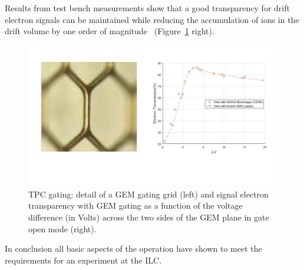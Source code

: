 Results from test bench measurements show that a good transparency for drift electron signals can be maintained while reducing the accumulation of ions in the drift volume by one order of magnitude~\cite{ild:bib:TPC_gatingpaper} (Figure~\ref{fig:det:TPC_gating} right).

\begin{figure}[t!]
\centering
\includegraphics[width=1.0\hsize]{Detector/fig/TPC_gating.jpg}
\caption{TPC gating: detail of a GEM gating grid (left) and signal electron transparency with GEM gating as a function of the voltage difference (in Volts) across the two sides of the GEM plane in gate open mode (right).} 
\label{fig:det:TPC_gating}
\end{figure}

In conclusion all basic aspects of the operation have shown to meet the requirements for an experiment at the ILC. 